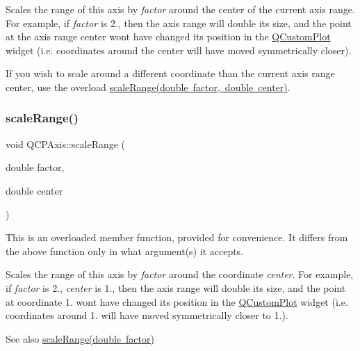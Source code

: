 Scales the range of this axis by {\itshape factor} around the center of the current axis range. For example, if {\itshape factor} is 2., then the axis range will double its size, and the point at the axis range center won\textquotesingle{}t have changed its position in the \mbox{\hyperlink{class_q_custom_plot}{Q\+Custom\+Plot}} widget (i.\+e. coordinates around the center will have moved symmetrically closer).

If you wish to scale around a different coordinate than the current axis range center, use the overload \mbox{\hyperlink{class_q_c_p_axis_a7072ff96fe690148f1bbcdb4f773ea1c}{scale\+Range(double factor, double center)}}. \mbox{\label{class_q_c_p_axis_a7072ff96fe690148f1bbcdb4f773ea1c}} 
\subsubsection{\texorpdfstring{scaleRange()}{scaleRange()}\hspace{0.1cm}{\footnotesize\ttfamily [2/2]}}
{\footnotesize\ttfamily void Q\+C\+P\+Axis\+::scale\+Range (\begin{DoxyParamCaption}\item[{double}]{factor,  }\item[{double}]{center }\end{DoxyParamCaption})}

This is an overloaded member function, provided for convenience. It differs from the above function only in what argument(s) it accepts.

Scales the range of this axis by {\itshape factor} around the coordinate {\itshape center}. For example, if {\itshape factor} is 2., {\itshape center} is 1., then the axis range will double its size, and the point at coordinate 1. won\textquotesingle{}t have changed its position in the \mbox{\hyperlink{class_q_custom_plot}{Q\+Custom\+Plot}} widget (i.\+e. coordinates around 1. will have moved symmetrically closer to 1.).

\begin{DoxySeeAlso}{See also}
\mbox{\hyperlink{class_q_c_p_axis_a31d18ddf3a4f21ceb077db8ae5b69856}{scale\+Range(double factor)}} 
\end{DoxySeeAlso}
\mbox{\label{class_q_c_p_axis_ad23e9ad97b44e9aeaf4fab8904280098}} 
